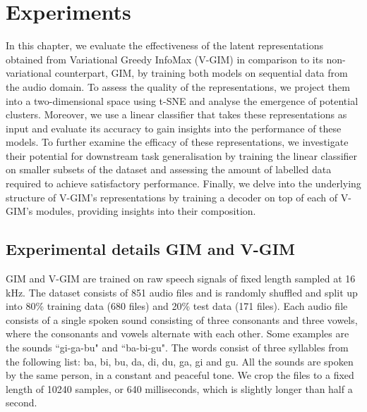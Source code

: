 \chapter{Experiments} \label{cha:4}

In this chapter, we evaluate the effectiveness of the latent representations obtained from Variational Greedy InfoMax (V-GIM) in comparison to its non-variational counterpart, GIM, by training both models on sequential data from the audio domain. To assess the quality of the representations, we project them into a two-dimensional space using t-SNE and analyse the emergence of potential clusters. Moreover, we use a linear classifier that takes these representations as input and evaluate its accuracy to gain insights into the performance of these models. To further examine the efficacy of these representations, we investigate their potential for downstream task generalisation by training the linear classifier on smaller subsets of the dataset and assessing the amount of labelled data required to achieve satisfactory performance. Finally, we delve into the underlying structure of V-GIM's representations by training a decoder on top of each of V-GIM's modules, providing insights into their composition.


%	

	







\section{Experimental details GIM and V-GIM} \label{cha:experim_details_vgim}
		GIM and V-GIM are trained on raw speech signals of fixed length sampled at 16 kHz. The dataset consists of 851  audio files and is randomly shuffled and split up into 80\% training data (680 files) and 20\% test data (171 files). Each audio file consists of a single spoken sound consisting of three consonants and three vowels, where the consonants and vowels alternate with each other. Some examples are the sounds ``gi-ga-bu" and ``ba-bi-gu". The words consist of three syllables from the following list: ba, bi, bu, da, di, du, ga, gi and gu. All the sounds are spoken by the same person, in a constant and peaceful tone. We crop the files to a fixed length of 10240 samples, or 640 milliseconds, which is slightly longer than half a second.
		
